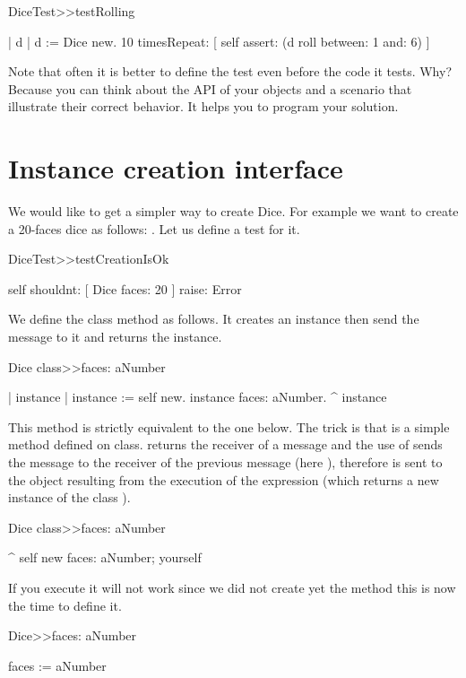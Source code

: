 \documentclass[a4paper,10pt,twoside]{book}
\begin{document}
\begin{code}{}
DiceTest>>testRolling
	
	| d |
	d := Dice new. 
	10 timesRepeat: [ self assert: (d roll between: 1 and: 6) ]
\end{code}


Note that often it is better to define the test even before the code it tests. Why? Because you can think about the API of your objects and a scenario that illustrate their correct behavior. It helps you to program your solution.
\section{ Instance creation interface}
We would like to get a simpler way to create Dice. For example we want to create a 20-faces dice as follows: . Let us define a test for it.


\begin{code}{}
DiceTest>>testCreationIsOk
	
		self shouldnt: [ Dice faces: 20 ] raise: Error
\end{code}


We define the class method  as follows. It creates an instance then send the message  to it and returns the instance.


\begin{code}{}
Dice class>>faces: aNumber

	| instance |
	instance := self new.
	instance faces: aNumber.
	^ instance
\end{code}


This method is strictly equivalent to the one below. The trick is that  is a simple method defined on  class.  returns the receiver of a message and the use of \ct{;} sends the message to the receiver of the previous message (here ), therefore  is sent to the object resulting from the execution of the expression  (which returns a new instance of the class ). 


\begin{code}{}
Dice class>>faces: aNumber
	
	^ self new faces: aNumber; yourself
\end{code}


If you execute it will not work since we did not create yet the method  this is now the time to define it.

\begin{code}{}
Dice>>faces: aNumber

	faces := aNumber
\end{code}
\end{document}
